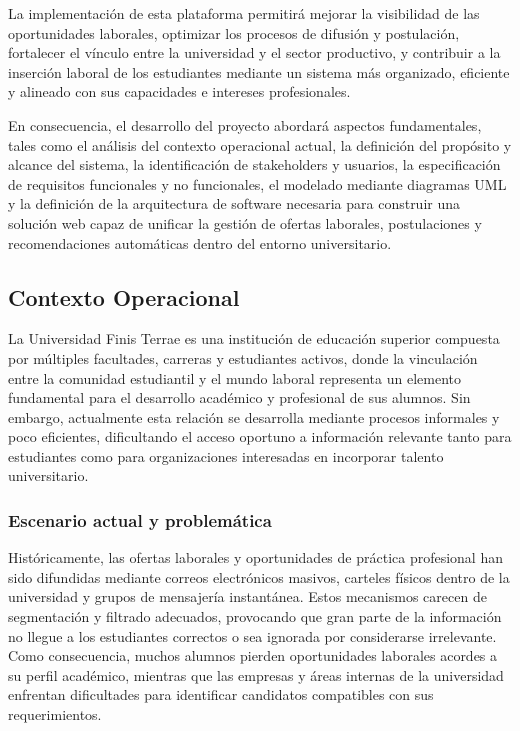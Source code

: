 \documentclass[11pt,a4paper]{Plantilla}
\begin{document}
\vspace{0.5cm}

La implementación de esta plataforma permitirá mejorar la visibilidad de las oportunidades laborales, optimizar los procesos de difusión y postulación, fortalecer el vínculo entre la universidad y el sector productivo, y contribuir a la inserción laboral de los estudiantes mediante un sistema más organizado, eficiente y alineado con sus capacidades e intereses profesionales.

\vspace{0.5cm}

En consecuencia, el desarrollo del proyecto abordará aspectos fundamentales, tales como el análisis del contexto operacional actual, la definición del propósito y alcance del sistema, la identificación de stakeholders y usuarios, la especificación de requisitos funcionales y no funcionales, el modelado mediante diagramas UML y la definición de la arquitectura de software necesaria para construir una solución web capaz de unificar la gestión de ofertas laborales, postulaciones y recomendaciones automáticas dentro del entorno universitario.

\subsection{Contexto Operacional}%

La Universidad Finis Terrae es una institución de educación superior compuesta por múltiples facultades, carreras y estudiantes activos, donde la vinculación entre la comunidad estudiantil y el mundo laboral representa un elemento fundamental para el desarrollo académico y profesional de sus alumnos. Sin embargo, actualmente esta relación se desarrolla mediante procesos informales y poco eficientes, dificultando el acceso oportuno a información relevante tanto para estudiantes como para organizaciones interesadas en incorporar talento universitario.

\vspace{0.3cm}

\subsubsection{Escenario actual y problemática}

Históricamente, las ofertas laborales y oportunidades de práctica profesional han sido difundidas mediante correos electrónicos masivos, carteles físicos dentro de la universidad y grupos de mensajería instantánea. Estos mecanismos carecen de segmentación y filtrado adecuados, provocando que gran parte de la información no llegue a los estudiantes correctos o sea ignorada por considerarse irrelevante. Como consecuencia, muchos alumnos pierden oportunidades laborales acordes a su perfil académico, mientras que las empresas y áreas internas de la universidad enfrentan dificultades para identificar candidatos compatibles con sus requerimientos.
\end{document}
